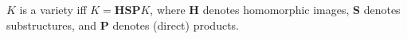 $K$ is a variety iff $K = \mathbf{HSP}K$, where $\mathbf{H}$ denotes homomorphic images, $\mathbf{S}$ denotes substructures, and $\mathbf{P}$ denotes (direct) products.
